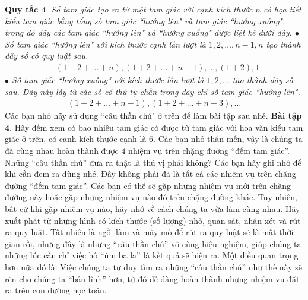 \vskip 0.1cm
{\bf\color{toancuabi} Quy tắc $\pmb{4.}$} \textit{Số tam giác tạo ra từ một tam giác với cạnh kích thước $n$ có họa tiết kiểu tam giác bằng tổng số tam giác ``hướng lên" và tam giác ``hướng xuống", trong đó dãy các tam giác ``hướng lên" và ``hướng xuống" được liệt kê dưới đây.
	\vskip 0.1cm
	$\bullet$ Số tam giác ``hướng lên" với kích thước cạnh lần lượt là $1, 2,\ldots, n-1, n$ tạo thành dãy số có quy luật sau.
	\begin{align*}
		&(1\!+\!2\!+\!\ldots\!+\!n), (1\!+\!2\!+\!\ldots\!+\! n\!-\!1), \ldots,(1\!+\!2), 1 
	\end{align*}
	$\bullet$ Số tam giác ``hướng xuống" với kích thước lần lượt là $1, 2,\ldots$ tạo thành dãy số sau. Dãy này lấy từ các số có thứ tự chẵn trong dãy chỉ số tam giác ``hướng lên".}
\begin{align*}
	(1 \!+\! 2 \!+\! \ldots \!+\! n\!-\!1), (1 \!+\! 2 \!+\! \ldots \!+\! n\!-\!3),\ldots
\end{align*}
Các bạn nhỏ hãy sử dụng ``câu thần chú" ở trên để làm bài tập sau nhé. 
\vskip 0.1cm
{\bf\color{toancuabi} Bài tập $\pmb{4.}$} Hãy đếm xem có bao nhiêu tam giác có được từ tam giác với hoa văn kiểu tam giác ở trên, có cạnh kích thước cạnh là $6$.
\vskip 0.1cm
Các bạn nhỏ thân mến, vậy là chúng ta đã cùng nhau hoàn thành được $4$ nhiệm vụ trên chặng đường “đếm tam giác”. Những “câu thần chú” đưa ra thật là thú vị phải không? Các bạn hãy ghi nhớ để khi cần đem ra dùng nhé. Đây không phải đã là tất cả các nhiệm vụ trên chặng đường “đếm tam giác”. Các bạn có thể sẽ gặp những nhiệm vụ mới trên chặng đường này hoặc gặp những nhiệm vụ nào đó trên chặng đường khác. Tuy nhiên, bất cứ khi gặp nhiệm vụ nào, hãy nhớ về cách chúng ta vừa làm cùng nhau. Hãy xuất phát từ những hình có kích thước (số lượng) nhỏ, quan sát, nhận xét và rút ra quy luật. Tất nhiên là ngồi làm và mày mò để rút ra quy luật sẽ là mất thời gian rồi, nhưng đây là những “câu thần chú” vô cùng hiệu nghiệm, giúp chúng ta những lúc cần chỉ việc hô “úm ba la” là kết quả sẽ hiện ra. Một điều quan trọng hơn nữa đó là: Việc chúng ta tư duy tìm ra những “câu thần chú” như thế này sẽ rèn cho chúng ta “bản lĩnh” hơn, từ đó dễ dàng hoàn thành những nhiệm vụ đặt ra trên con đường học toán.